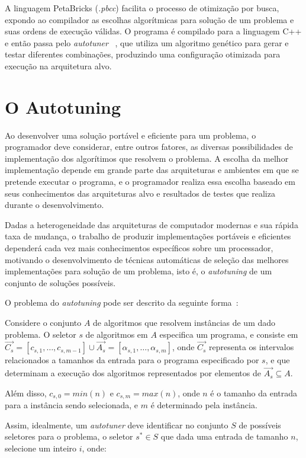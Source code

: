 \documentclass[a4paper, 11pt, twoside]{article}
\begin{document}
A linguagem PetaBricks (\emph{.pbcc}) facilita o processo de 
otimização por busca, expondo ao compilador as escolhas algorítmicas para 
solução de um problema e suas ordens de execução válidas. O programa é 
compilado para a linguagem C++ e então passa pelo \emph{autotuner} 
~\cite{ansel2011efficient}, que utiliza um algoritmo genético para gerar e 
testar diferentes combinações, produzindo uma configuração otimizada para 
execução na arquitetura alvo.

\section{O Autotuning}

Ao desenvolver uma solução portável e eficiente para um problema, o
programador deve considerar, entre outros fatores, as diversas possibilidades
de implementação dos algorítimos que resolvem o problema. A escolha da melhor
implementação depende em grande parte das arquiteturas e ambientes em que se 
pretende executar o programa, e o programador realiza essa escolha baseado
em seus conhecimentos das arquiteturas alvo e resultados de testes que realiza
durante o desenvolvimento. 

Dadas a heterogeneidade das arquiteturas de computador modernas e sua rápida 
taxa de mudança, o trabalho de produzir implementações portáveis e eficientes 
dependerá cada vez mais conhecimentos específicos sobre um processador,
motivando o desenvolvimento de técnicas automáticas de seleção das melhores
implementações para solução de um problema, isto é, o \emph{autotuning} de um
conjunto de soluções possíveis.

O problema do \emph{autotuning} pode ser descrito da seguinte forma~\cite{ansel2011efficient}:

Considere o conjunto $A$ de algoritmos que resolvem instâncias de um dado problema.
O seletor $s$ de algoritmos em $A$ especifica um programa, e consiste em
$\overrightarrow{C_s} = [c_{s,1},\dots,c_{s,m-1}] \cup \overrightarrow{A_s} = [\alpha_{s,1},\dots,\alpha_{s,m}]$, 
onde $\overrightarrow{C_s}$ representa os intervalos relacionados a tamanhos da
entrada para o programa especificado por $s$, e que determinam a execução dos 
algoritmos representados por elementos de $\overrightarrow{A_s} \subseteq A$.

Além disso, $c_{s,0} = min(n)$ e $c_{s,m} = max(n)$,
onde $n$ é o tamanho da entrada para a instância sendo selecionada, e $m$ 
é determinado pela instância.

Assim, idealmente, um \emph{autotuner} deve identificar no conjunto $S$ de
possíveis seletores para o problema, o seletor $s^* \in S$ que dada uma 
entrada de tamanho $n$, selecione um inteiro $i$, onde:
\end{document}
